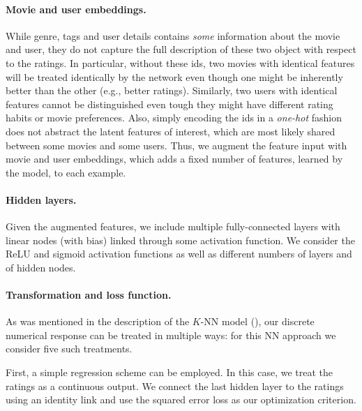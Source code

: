 \documentclass[bj, preprint]{imsart}
\begin{document}
\paragraph{Movie and user embeddings.}\label{par:method.models.nn.embed}

While genre, tags and user details contains \textit{some} information about the movie and user, they do not capture the full description of these two object with respect to the ratings. 
In particular, without these ids, two movies with identical features will be treated identically by the network even though one might be inherently better than the other (e.g., better ratings).
Similarly, two users with identical features cannot be distinguished even tough they might have different rating habits or movie preferences.
Also, simply encoding the ids in a \textit{one-hot} fashion does not abstract the latent features of interest, which are most likely shared between some movies and some users. 
Thus, we augment the feature input with movie and user embeddings, which adds a fixed number of features, learned by the model, to each example. 


\paragraph{Hidden layers.}\label{par:method.models.nn.hidden}

Given the augmented features, we include multiple fully-connected layers with linear nodes (with bias) linked through some activation function. We consider the ReLU and sigmoid activation functions as well as different numbers of layers and of hidden nodes.

\paragraph{Transformation and loss function.}\label{par:method.models.nn.transform}

As was mentioned in the description of the $K$-NN model (), our discrete numerical response can be treated in multiple ways: for this NN approach we consider five such treatments.

First, a simple regression scheme can be employed. In this case, we treat the ratings as a continuous output. We connect the last hidden layer to the ratings using an identity link and use the squared error loss as our optimization criterion.
\end{document}
